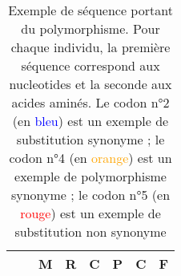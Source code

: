 \documentclass[../main]{subfiles} %
\begin{document}
\begin{table}[]
\begin{tabular}{cccccccc}
                                            &                               & M    & \textbf{R}    & C    & \textbf{P}    & \textbf{C}   & F   \\
        \bottomrule
    \end{tabular}
    \caption{Exemple de séquence portant du polymorphisme. Pour chaque individu, la première séquence correspond aux \glspl{nucleotide} et la seconde aux acides aminés. Le \gls{codon} n°2 (en \textcolor{blue}{bleu}) est un exemple de \gls{substitution} \gls{synonyme} ; le \gls{codon} n°4 (en \textcolor{orange}{orange}) est un exemple de \gls{polymorphisme} \gls{synonyme} ; le \gls{codon} n°5 (en \textcolor{red}{rouge}) est un exemple de \gls{substitution} non \gls{synonyme}
    }
    \label{tab:seqEx}
\end{table}

\end{document}
